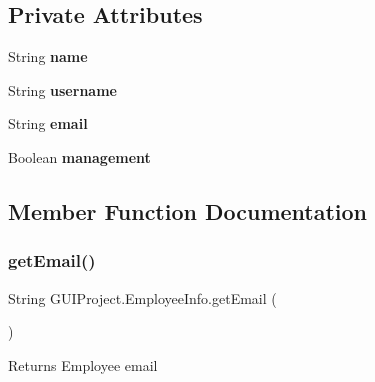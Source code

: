 \subsection*{Private Attributes}
\begin{DoxyCompactItemize}
\item 
\mbox{\label{class_g_u_i_project_1_1_employee_info_a8979d5c2bd22aaa5248f108d525ad776}} 
String {\bfseries name}
\item 
\mbox{\label{class_g_u_i_project_1_1_employee_info_af299b0c2f4cf24da0e8550cba9048fec}} 
String {\bfseries username}
\item 
\mbox{\label{class_g_u_i_project_1_1_employee_info_aae2f74a20bc5c001e96ac9eb16fe39db}} 
String {\bfseries email}
\item 
\mbox{\label{class_g_u_i_project_1_1_employee_info_a461f25a56ff4b38676a2ad6a21344efd}} 
Boolean {\bfseries management}
\end{DoxyCompactItemize}


\subsection{Member Function Documentation}
\mbox{\label{class_g_u_i_project_1_1_employee_info_a763f619de772d5b8f1beaf5844359525}} 
\subsubsection{\texorpdfstring{getEmail()}{getEmail()}}
{\footnotesize\ttfamily String G\+U\+I\+Project.\+Employee\+Info.\+get\+Email (\begin{DoxyParamCaption}{ }\end{DoxyParamCaption})}

\begin{DoxyReturn}{Returns}
Employee email 
\end{DoxyReturn}
\mbox{\label{class_g_u_i_project_1_1_employee_info_ac8a3e0faa30e47b980839e27873052b0}} 
